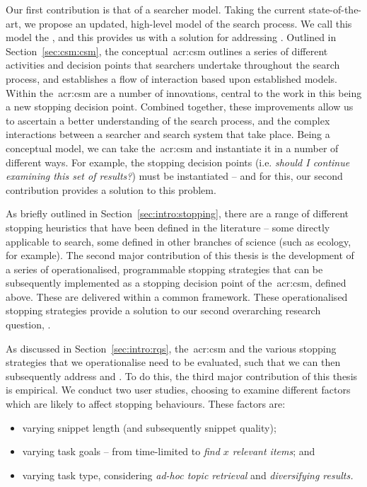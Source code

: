 \noindent
{}
Our first contribution is that of a searcher model. Taking the current state-of-the-art, we propose an updated, high-level model of the search process. We call this model the , and this provides us with a solution for addressing . Outlined in Section~\ref{sec:csm:csm}, the conceptual~\gls{acr:csm} outlines a series of different activities and decision points that searchers undertake throughout the search process, and establishes a flow of interaction based upon established models. Within the~\gls{acr:csm} are a number of innovations, central to the work in this being a new stopping decision point. Combined together, these improvements allow us to ascertain a better understanding of the search process, and the complex interactions between a searcher and search system that take place. Being a conceptual model, we can take the~\gls{acr:csm} and instantiate it in a number of different ways. For example, the stopping decision points (i.e. \emph{should I continue examining this set of results?}) must be instantiated -- and for this, our second contribution provides a solution to this problem.

\noindent
{}
As briefly outlined in Section~\ref{sec:intro:stopping}, there are a range of different stopping heuristics that have been defined in the literature -- some directly applicable to search, some defined in other branches of science (such as ecology, for example). The second major contribution of this thesis is the development of a series of operationalised, programmable stopping strategies that can be subsequently implemented as a stopping decision point of the~\gls{acr:csm}, defined above. These are delivered within a common framework. These operationalised stopping strategies provide a solution to our second overarching research question, .

\noindent
{}
As discussed in Section~\ref{sec:intro:rqs}, the~\gls{acr:csm} and the various stopping strategies that we operationalise need to be evaluated, such that we can then subsequently address  and . To do this, the third major contribution of this thesis is empirical. We conduct two user studies, choosing to examine different factors which are likely to affect stopping behaviours. These factors are:

\begin{itemize}
    \item{varying snippet length (and subsequently snippet quality);}
    \item{varying task goals -- from time-limited to \emph{find $x$ relevant items}; and}
    \item{varying task type, considering \emph{ad-hoc topic retrieval} and \emph{diversifying results.}}
\end{itemize}

